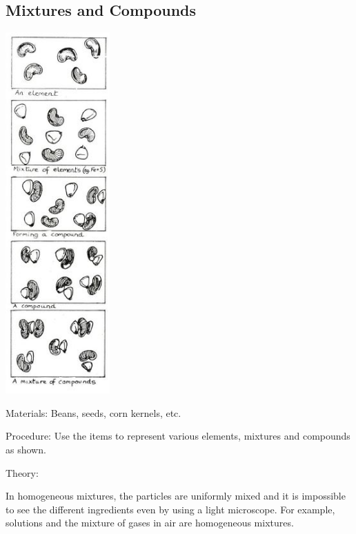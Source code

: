 \begin{multicols}{2}
\vfill
\columnbreak

\subsection{Mixtures and Compounds}

\begin{center}
\includegraphics[width=0.3\textwidth]{./img/source/mixtures-compounds.jpg}
\end{center}

\begin{description*}
\item[Materials:]{Beans, seeds, corn kernels, etc.}
\item[Procedure:]{Use the items to represent various elements, mixtures and compounds as shown.}
\item[Theory:]{In homogeneous mixtures, the particles are
uniformly mixed and it is impossible to see the
different ingredients even by using a light
microscope. For example, solutions and the
mixture of gases in air are homogeneous
mixtures.

}
\end{description*}
\end{multicols}
